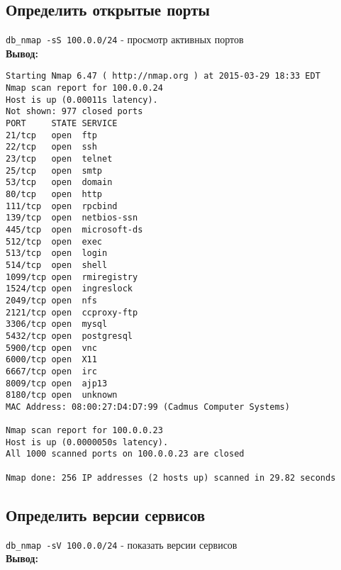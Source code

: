 \documentclass[12pt,a4paper]{article}
\begin{document}
\subsection{Определить открытые порты}

\verb+db_nmap -sS 100.0.0/24+ - просмотр активных портов\\

\textbf{Вывод:}

\begin{lstlisting}
Starting Nmap 6.47 ( http://nmap.org ) at 2015-03-29 18:33 EDT
Nmap scan report for 100.0.0.24
Host is up (0.00011s latency).
Not shown: 977 closed ports
PORT     STATE SERVICE
21/tcp   open  ftp
22/tcp   open  ssh
23/tcp   open  telnet
25/tcp   open  smtp
53/tcp   open  domain
80/tcp   open  http
111/tcp  open  rpcbind
139/tcp  open  netbios-ssn
445/tcp  open  microsoft-ds
512/tcp  open  exec
513/tcp  open  login
514/tcp  open  shell
1099/tcp open  rmiregistry
1524/tcp open  ingreslock
2049/tcp open  nfs
2121/tcp open  ccproxy-ftp
3306/tcp open  mysql
5432/tcp open  postgresql
5900/tcp open  vnc
6000/tcp open  X11
6667/tcp open  irc
8009/tcp open  ajp13
8180/tcp open  unknown
MAC Address: 08:00:27:D4:D7:99 (Cadmus Computer Systems)

Nmap scan report for 100.0.0.23
Host is up (0.0000050s latency).
All 1000 scanned ports on 100.0.0.23 are closed

Nmap done: 256 IP addresses (2 hosts up) scanned in 29.82 seconds
\end{lstlisting}
\newpage
\subsection{Определить версии сервисов}
\verb+db_nmap -sV 100.0.0/24+ - показать версии сервисов\\

\textbf{Вывод:}
\end{document}
